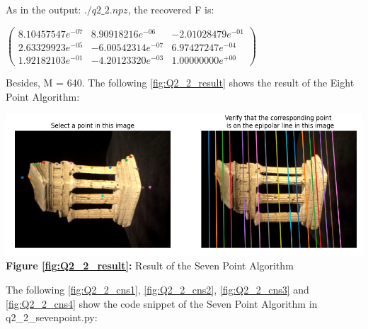 \begin{your_solution}[title=Q2.2,height=21.5cm,width=\linewidth]
As in the output: $./q2\_2.npz$, the recovered F is: 
\newline

$\begin{pmatrix}
8.10457547e^{-07} &  8.90918216e^{-06} & -2.01028479e^{-01} \\
2.63329923e^{-05} & -6.00542314e^{-07} &  6.97427247e^{-04} \\
1.92182103e^{-01} & -4.20123320e^{-03} &  1.00000000e^{+00}
\end{pmatrix}$
\newline

Besides, M = 640.
\newline
The following \autoref{fig:Q2_2_result} shows the result of the Eight Point Algorithm:
\newline
\begin{minipage}{1\linewidth}
	\centering
	\includegraphics[width=\linewidth]{../Q2_2_result.png}
	\textbf{Figure \ref{fig:Q2_2_result}:} Result of the Seven Point Algorithm  %
	\label{fig:Q2_2_result}         %
\end{minipage}
\newline

The following \autoref{fig:Q2_2_cns1}, \autoref{fig:Q2_2_cns2}, \autoref{fig:Q2_2_cns3} and \autoref{fig:Q2_2_cns4} show the code snippet of the Seven Point Algorithm in q2\_2\_sevenpoint.py:
\newline



\end{your_solution}

